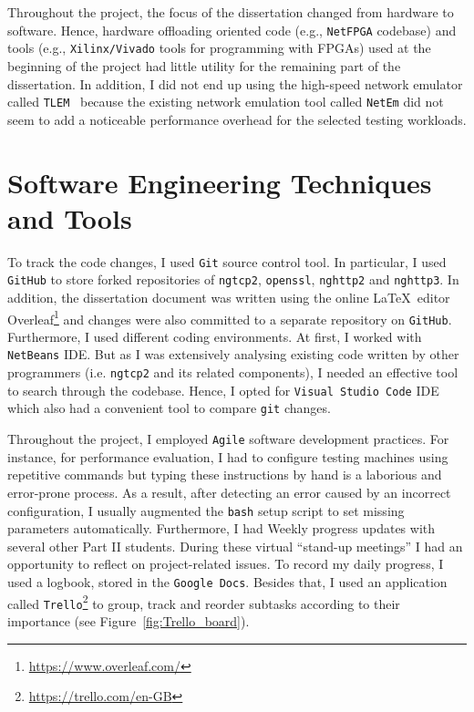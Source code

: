 \documentclass[12pt,a4paper]{report}
\begin{document}
Throughout the project, the focus of the dissertation changed from hardware to software.
Hence, hardware offloading oriented code (e.g., \texttt{NetFPGA} codebase) and tools (e.g., \texttt{Xilinx/Vivado} tools for programming with FPGAs) used at the beginning of the project had little utility for the remaining part of the dissertation.
In addition, I did not end up using the high-speed network emulator called \texttt{TLEM}~\cite{TLEM_tool} because the existing network emulation tool called \texttt{NetEm} did not seem to add a noticeable performance overhead for the selected testing workloads.


\section{Software Engineering Techniques and Tools} \label{Software_Engineering_Techniques_and_Tools}
    To track the code changes, I used \texttt{Git} source control tool.
    In particular, I used \texttt{GitHub} to store forked repositories of \texttt{ngtcp2}, \texttt{openssl}, \texttt{nghttp2} and \texttt{nghttp3}.
    In addition, the dissertation document was written using the online \LaTeX\  editor Overleaf\footnote{\url{https://www.overleaf.com/}} and changes were also committed to a separate repository on \texttt{GitHub}.
    Furthermore, I used different coding environments.
    At first, I worked with \texttt{NetBeans} IDE.
    But as I was extensively analysing existing code written by other programmers (i.e. \texttt{ngtcp2} and its related components), I needed an effective tool to search through the codebase.
    Hence, I opted for \texttt{Visual Studio Code} IDE which also had a convenient tool to compare \texttt{git} changes.
    
    
    Throughout the project, I employed \texttt{Agile} software development practices.
    For instance, for performance evaluation, I had to configure testing machines using repetitive commands but typing these instructions by hand is a laborious and error-prone process.
    As a result, after detecting an error caused by an incorrect configuration, I usually augmented the \texttt{bash} setup script to set missing parameters automatically.
    Furthermore, I had Weekly progress updates with several other Part II students.
    During these virtual \enquote{stand-up meetings} I had an opportunity to reflect on project-related issues.
    To record my daily progress, I used a logbook, stored in the \texttt{Google Docs}.
    Besides that, I used an application called \texttt{Trello}\footnote{\url{https://trello.com/en-GB}} to group, track and reorder subtasks according to their importance (see Figure~\ref{fig:Trello_board}).
\end{document}
